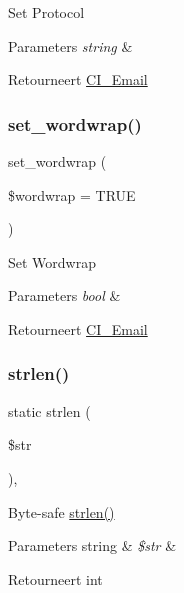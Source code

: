 Set Protocol


\begin{DoxyParams}{Parameters}
{\em string} & \\
\hline
\end{DoxyParams}
\begin{DoxyReturn}{Retourneert}
\mbox{\hyperlink{class_c_i___email}{C\+I\+\_\+\+Email}} 
\end{DoxyReturn}
\mbox{\label{class_c_i___email_a6abb8d5f17213eba1e243ca633da8084}} 
\subsubsection{\texorpdfstring{set\_wordwrap()}{set\_wordwrap()}}
{\footnotesize\ttfamily set\+\_\+wordwrap (\begin{DoxyParamCaption}\item[{}]{\$wordwrap = {\ttfamily TRUE} }\end{DoxyParamCaption})}

Set Wordwrap


\begin{DoxyParams}{Parameters}
{\em bool} & \\
\hline
\end{DoxyParams}
\begin{DoxyReturn}{Retourneert}
\mbox{\hyperlink{class_c_i___email}{C\+I\+\_\+\+Email}} 
\end{DoxyReturn}
\mbox{\label{class_c_i___email_a4c29a687d4ed62c26a10e41d98930d5f}} 
\subsubsection{\texorpdfstring{strlen()}{strlen()}}
{\footnotesize\ttfamily static strlen (\begin{DoxyParamCaption}\item[{}]{\$str }\end{DoxyParamCaption})\hspace{0.3cm}{\ttfamily [static]}, {\ttfamily [protected]}}

Byte-\/safe \mbox{\hyperlink{class_c_i___email_a4c29a687d4ed62c26a10e41d98930d5f}{strlen()}}


\begin{DoxyParams}[1]{Parameters}
string & {\em \$str} & \\
\hline
\end{DoxyParams}
\begin{DoxyReturn}{Retourneert}
int 
\end{DoxyReturn}
\mbox{\label{class_c_i___email_aaa61b3aaa6cc4c90e26686e4bf41587a}} 
